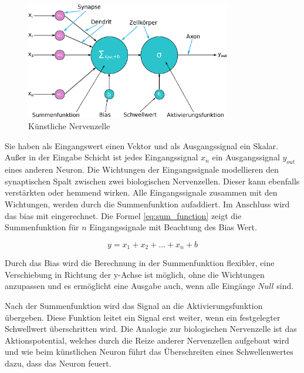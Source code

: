 \begin{figure}[!ht]
	\includegraphics[width=0.8\textwidth]{content/chapter_basics/images/artificial_neuron.eps}
	\centering
	\caption{Künstliche Nervenzelle}
	\label{img:artificial_neuron}
\end{figure}

Sie haben als Eingangswert einen Vektor und als Ausgangssignal ein Skalar. Außer in der Eingabe Schicht ist jedes Eingangssignal $x_n$ ein Ausgangssignal $y_{out}$ eines anderen Neuron. Die Wichtungen der Eingangssignale modellieren den synaptischen Spalt zwischen zwei biologischen Nervenzellen. Dieser kann ebenfalls verstärkten oder hemmend wirken. Alle Eingangssignale zusammen mit den Wichtungen, werden durch die Summenfunktion aufaddiert. Im Anschluss wird das \gls{bias} mit eingerechnet. Die Formel \ref{eq:sum_function} zeigt die Summenfunktion für $n$ Eingangssignale mit Beachtung des Bias Wert.

\begin{equation} \label{eq:sum_function}
	y = x_{1} + x_{2} + \dots + x_{n} + b
\end{equation}

Durch das Bias wird die Berechnung in der Summenfunktion flexibler, eine Verschiebung in Richtung der y-Achse ist möglich, ohne die Wichtungen anzupassen und es ermöglicht eine Ausgabe auch, wenn alle Eingänge $Null$ sind.\vspace{0.2cm}

Nach der Summenfunktion wird das Signal an die Aktivierungsfunktion übergeben. Diese Funktion leitet ein Signal erst weiter, wenn ein festgelegter Schwellwert überschritten wird. Die Analogie zur biologischen Nervenzelle ist das Aktionspotential, welches durch die Reize anderer Nervenzellen aufgebaut wird und wie beim künstlichen Neuron führt das Überschreiten eines Schwellenwertes dazu, dass das Neuron \glqq feuert\grqq. \vspace{0.2cm}

